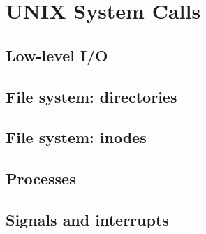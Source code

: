 \chapter{UNIX System Calls}
\section{Low-level I/O}
\section{File system: directories}
\section{File system: inodes}
\section{Processes}
\section{Signals and interrupts}
